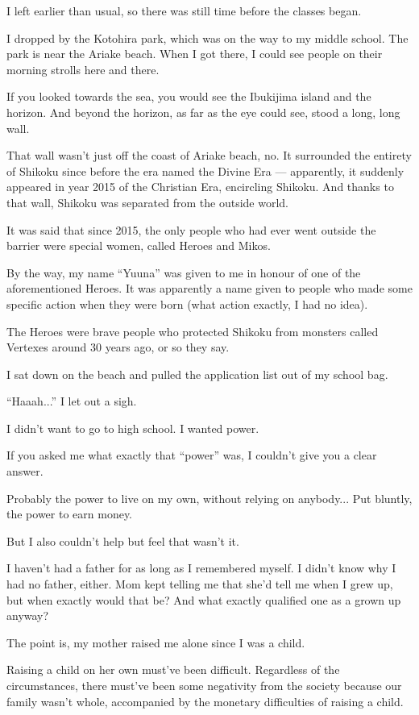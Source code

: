I left earlier than usual, so there was still time before the classes began.

I dropped by the Kotohira park, which was on the way to my middle school. The park is near the Ariake beach. When I got there, I could see people on their morning strolls here and there.

If you looked towards the sea, you would see the Ibukijima island and the horizon. And beyond the horizon, as far as the eye could see, stood a long, long wall.

That wall wasn't just off the coast of Ariake beach, no. It surrounded the entirety of Shikoku since before the era named the Divine Era --- apparently, it suddenly appeared in year 2015 of the Christian Era, encircling Shikoku. And thanks to that wall, Shikoku was separated from the outside world.

It was said that since 2015, the only people who had ever went outside the barrier were special women, called Heroes and Mikos.

By the way, my name ``Yuuna'' was given to me in honour of one of the aforementioned Heroes. It was apparently a name given to people who made some specific action when they were born (what action exactly, I had no idea).

The Heroes were brave people who protected Shikoku from monsters called Vertexes around 30 years ago, or so they say.

I sat down on the beach and pulled the application list out of my school bag.

``Haaah...'' I let out a sigh.

I didn't want to go to high school. I wanted power.

If you asked me what exactly that ``power'' was, I couldn't give you a clear answer.

Probably the power to live on my own, without relying on anybody... Put bluntly, the power to earn money.

But I also couldn't help but feel that wasn't it.

I haven't had a father for as long as I remembered myself. I didn't know why I had no father, either. Mom kept telling me that she'd tell me when I grew up, but when exactly would that be? And what exactly qualified one as a grown up anyway?

The point is, my mother raised me alone since I was a child.

Raising a child on her own must've been difficult. Regardless of the circumstances, there must've been some negativity from the society because our family wasn't whole, accompanied by the monetary difficulties of raising a child.

